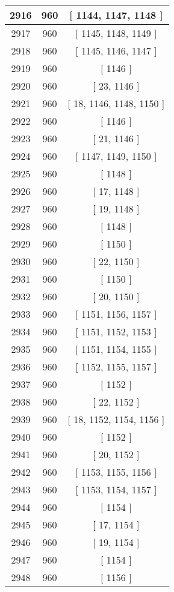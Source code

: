 \begin{center}
\begin{longtable}[H]{|| c c c ||}
\hline
2916 & 960 & [ 1144, 1147, 1148 ] \\ 
\hline
2917 & 960 & [ 1145, 1148, 1149 ] \\ 
\hline
2918 & 960 & [ 1145, 1146, 1147 ] \\ 
\hline
2919 & 960 & [ 1146 ] \\ 
\hline
2920 & 960 & [ 23, 1146 ] \\ 
\hline
2921 & 960 & [ 18, 1146, 1148, 1150 ] \\ 
\hline
2922 & 960 & [ 1146 ] \\ 
\hline
2923 & 960 & [ 21, 1146 ] \\ 
\hline
2924 & 960 & [ 1147, 1149, 1150 ] \\ 
\hline
2925 & 960 & [ 1148 ] \\ 
\hline
2926 & 960 & [ 17, 1148 ] \\ 
\hline
2927 & 960 & [ 19, 1148 ] \\ 
\hline
2928 & 960 & [ 1148 ] \\ 
\hline
2929 & 960 & [ 1150 ] \\ 
\hline
2930 & 960 & [ 22, 1150 ] \\ 
\hline
2931 & 960 & [ 1150 ] \\ 
\hline
2932 & 960 & [ 20, 1150 ] \\ 
\hline
2933 & 960 & [ 1151, 1156, 1157 ] \\ 
\hline
2934 & 960 & [ 1151, 1152, 1153 ] \\ 
\hline
2935 & 960 & [ 1151, 1154, 1155 ] \\ 
\hline
2936 & 960 & [ 1152, 1155, 1157 ] \\ 
\hline
2937 & 960 & [ 1152 ] \\ 
\hline
2938 & 960 & [ 22, 1152 ] \\ 
\hline
2939 & 960 & [ 18, 1152, 1154, 1156 ] \\ 
\hline
2940 & 960 & [ 1152 ] \\ 
\hline
2941 & 960 & [ 20, 1152 ] \\ 
\hline
2942 & 960 & [ 1153, 1155, 1156 ] \\ 
\hline
2943 & 960 & [ 1153, 1154, 1157 ] \\ 
\hline
2944 & 960 & [ 1154 ] \\ 
\hline
2945 & 960 & [ 17, 1154 ] \\ 
\hline
2946 & 960 & [ 19, 1154 ] \\ 
\hline
2947 & 960 & [ 1154 ] \\ 
\hline
2948 & 960 & [ 1156 ] \\ 

\end{longtable}
\end{center}
